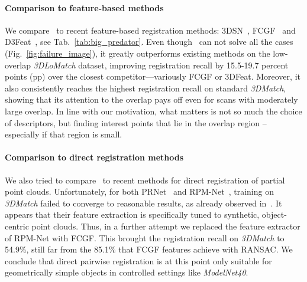 
\paragraph{Comparison to feature-based methods}
We compare \acro\ to recent feature-based registration methods: 3DSN~\cite{gojcic2018learned}, FCGF~\cite{Choy2019FCGF} and D3Feat~\cite{bai2020d3feat}, see Tab.~\ref{tab:big_predator}. 
Even though \acro\ can not solve all the cases (\cf Fig.~\ref{fig:failure_image}), it greatly outperforms existing methods on the low-overlap \emph{3DLoMatch} dataset, improving registration recall by 15.5-19.7 percent points (pp) over the closest competitor---variously FCGF or 3DFeat. 
Moreover, it also consistently reaches the highest registration recall on standard \emph{3DMatch}, showing that its attention to the overlap pays off even for scans with moderately large overlap.
In line with our motivation, what matters is not so much the choice of descriptors, but finding interest points that lie in the overlap region -- especially if that region is small. 


\paragraph{Comparison to direct registration methods}
We also tried to compare \acro\ to recent methods for direct registration of partial point clouds.
Unfortunately, for both PRNet~\cite{wang2019prnet} and RPM-Net~\cite{yew2020rpm}, training on \emph{3DMatch} failed to converge to reasonable results, as already observed in~\cite{choy2020deep}.
It appears that their feature extraction is specifically tuned to synthetic, object-centric point clouds.
Thus, in a further attempt we replaced the feature extractor of RPM-Net with FCGF.
This brought the registration recall on \emph{3DMatch} to 54.9\%, still far from the
85.1\%  that FCGF features achieve with RANSAC.
We conclude that direct pairwise registration is at this point only suitable for geometrically simple objects in controlled settings like \emph{ModelNet40}.



